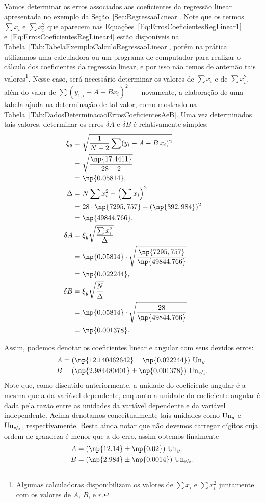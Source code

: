 Vamos determinar os erros associados aos coeficientes da regressão linear apresentada no exemplo da Seção~\ref{Sec:RegressaoLinear}. Note que os termos $\sum x_i$ e $\sum x_i^2$ que aparecem nas Equações~\eqref{Eq:ErrosCoeficientesRegLinear1} e~\eqref{Eq:ErrosCoeficientesRegLinear4} estão disponíveis na Tabela~\eqref{Tab:TabelaExemploCalculoRegressaoLinear}, porém na prática utilizamos uma calculadora ou um programa de computador para realizar o cálculo dos coeficientes da regressão linear, e por isso não temos de antemão tais valores\footnote{Algumas calculadoras disponibilizam os valores de $\sum x_i$ e $\sum x_i^2$ juntamente com os valores de $A$, $B$, e $r$.}. Nesse caso, será necessário determinar os valores de $\sum x_i$ e de $\sum x_i^2$, além do valor de $\sum (y_{1,i} - A - Bx_i)^2$ ---~novamente, a elaboração de uma tabela ajuda na determinação de tal valor, como mostrado na Tabela~\ref{Tab:DadosDeterminacaoErrosCoeficientesAeB}. Uma vez determinados tais valores, determinar os erros $\delta A$ e $\delta B$ é relativamente simples:
\begin{align}
	\xi_y &= \sqrt{\frac{1}{N-2}\sum(y_i-A-B\,x_i)^2} \\
	&= \sqrt{\frac{\np{17.4411}}{28-2}} \\
	&= \np{0.05814}, \\
	\Delta &= N\sum x_i^2 - \left(\sum x_i\right)^2 \\
	&= 28\cdot\np{7295,757} - (\np{392,984})^2 \\
	&= \np{49844.766}, \\
	\delta A &= \xi_y\sqrt{\frac{\sum x_i^2}{\Delta}} \\
	&= \np{0.05814} \cdot \sqrt{\frac{\np{7295,757}}{\np{49844.766}}} \\
	&= \np{0.022244}, \\
	\delta B &= \xi_y\sqrt{\frac{N}{\Delta}} \\
	&= \np{0.05814} \cdot \sqrt{\frac{28}{\np{49844.766}}} \\
	&= \np{0.001378}.
\end{align}

Assim, podemos denotar os coeficientes linear e angular com seus devidos erros:
\begin{align}
	A &= (\np{12.140462642} \pm \np{0.022244})~{\rm{Un}}_y\\
	B &= (\np{2.984480401} \pm \np{0.001378})~{\rm{Un}}_{\nicefrac{y}{x}}.
\end{align}
%
Note que, como discutido anteriormente, a unidade do coeficiente angular é a mesma que a da variável dependente, enquanto a unidade do coeficiente angular é dada pela razão entre as unidades da variável dependente e da variável independente. Acima denotamos conceitualmente tais unidades como ${\rm{Un}}_{y}$ e ${\rm{Un}}_{\nicefrac{y}{x}}$, respectivamente. Resta ainda notar que não devemos carregar dígitos cuja ordem de grandeza é menor que a do erro, assim obtemos finalmente
\begin{align}
	A &= (\np{12.14} \pm \np{0.02})~{\rm{Un}}_y\\
	B &= (\np{2.984} \pm \np{0.0014})~{\rm{Un}}_{\nicefrac{y}{x}}.
\end{align}


